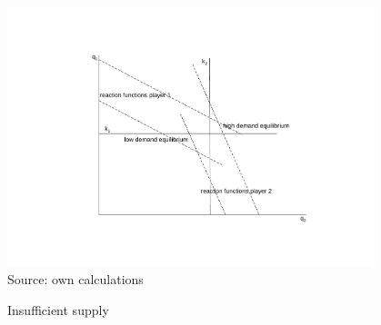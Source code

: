 \begin{figure}[h]
\centering
\caption{Insufficient supply}
\includegraphics[width=4.2in]{capacity/cournot_uncertainty.pdf}
      \label{cournot_uncertainty}  
\\          
\scriptsize Source: own calculations
\end{figure}






